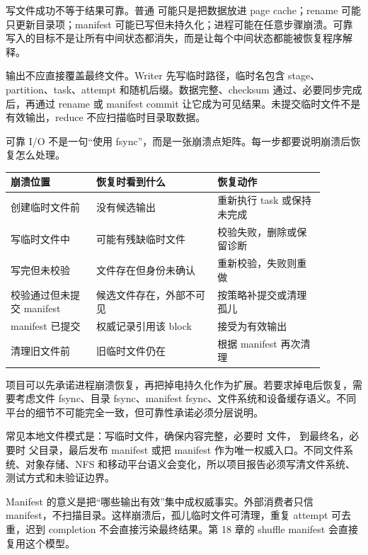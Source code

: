 写文件成功不等于结果可靠。普通  可能只是把数据放进 page cache；rename 可能只更新目录项；manifest 可能已写但未持久化；进程可能在任意步骤崩溃。可靠写入的目标不是让所有中间状态都消失，而是让每个中间状态都能被恢复程序解释。

输出不应直接覆盖最终文件。Writer 先写临时路径，临时名包含 stage、partition、task、attempt 和随机后缀。数据完整、checksum 通过、必要同步完成后，再通过 rename 或 manifest commit 让它成为可见结果。未提交临时文件不是有效输出，reduce 不应扫描临时目录取数据。

可靠 I/O 不是一句“使用 fsync”，而是一张崩溃点矩阵。每一步都要说明崩溃后恢复怎么处理。

\begin{center}
\begin{tabular}{p{0.24\linewidth}p{0.34\linewidth}p{0.30\linewidth}}
\toprule
崩溃位置 & 恢复时看到什么 & 恢复动作 \\
\midrule
创建临时文件前 & 没有候选输出 & 重新执行 task 或保持未完成 \\
写临时文件中 & 可能有残缺临时文件 & 校验失败，删除或保留诊断 \\
写完但未校验 & 文件存在但身份未确认 & 重新校验，失败则重做 \\
校验通过但未提交 manifest & 候选文件存在，外部不可见 & 按策略补提交或清理孤儿 \\
manifest 已提交 & 权威记录引用该 block & 接受为有效输出 \\
清理旧文件前 & 旧临时文件仍在 & 根据 manifest 再次清理 \\
\bottomrule
\end{tabular}
\end{center}

项目可以先承诺进程崩溃恢复，再把掉电持久化作为扩展。若要求掉电后恢复，需要考虑文件 fsync、目录 fsync、manifest fsync、文件系统和设备缓存语义。不同平台的细节不可能完全一致，但可靠性承诺必须分层说明。

常见本地文件模式是：写临时文件，确保内容完整，必要时  文件， 到最终名，必要时  父目录，最后发布 manifest 或把 manifest 作为唯一权威入口。不同文件系统、对象存储、NFS 和移动平台语义会变化，所以项目报告必须写清文件系统、测试方式和未验证边界。

Manifest 的意义是把“哪些输出有效”集中成权威事实。外部消费者只信 manifest，不扫描目录。这样崩溃后，孤儿临时文件可清理，重复 attempt 可去重，迟到 completion 不会直接污染最终结果。第 18 章的 shuffle manifest 会直接复用这个模型。

